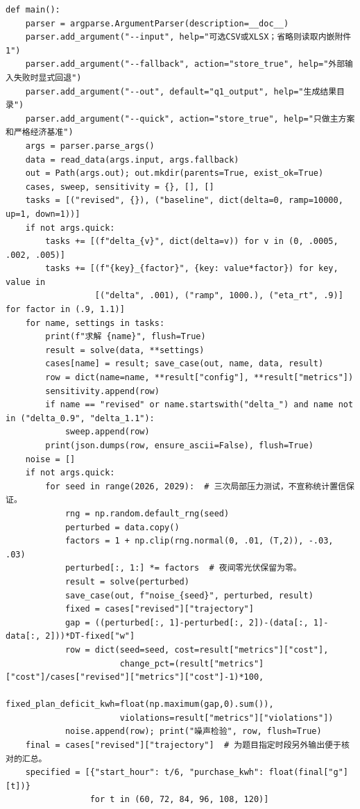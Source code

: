 \documentclass[withoutpreface,bwprint]{cumcmthesis}
\begin{document}
\begin{appendices}
\begin{lstlisting}
def main():
    parser = argparse.ArgumentParser(description=__doc__)
    parser.add_argument("--input", help="可选CSV或XLSX；省略则读取内嵌附件1")
    parser.add_argument("--fallback", action="store_true", help="外部输入失败时显式回退")
    parser.add_argument("--out", default="q1_output", help="生成结果目录")
    parser.add_argument("--quick", action="store_true", help="只做主方案和严格经济基准")
    args = parser.parse_args()
    data = read_data(args.input, args.fallback)
    out = Path(args.out); out.mkdir(parents=True, exist_ok=True)
    cases, sweep, sensitivity = {}, [], []
    tasks = [("revised", {}), ("baseline", dict(delta=0, ramp=10000, up=1, down=1))]
    if not args.quick:
        tasks += [(f"delta_{v}", dict(delta=v)) for v in (0, .0005, .002, .005)]
        tasks += [(f"{key}_{factor}", {key: value*factor}) for key, value in
                  [("delta", .001), ("ramp", 1000.), ("eta_rt", .9)] for factor in (.9, 1.1)]
    for name, settings in tasks:
        print(f"求解 {name}", flush=True)
        result = solve(data, **settings)
        cases[name] = result; save_case(out, name, data, result)
        row = dict(name=name, **result["config"], **result["metrics"])
        sensitivity.append(row)
        if name == "revised" or name.startswith("delta_") and name not in ("delta_0.9", "delta_1.1"):
            sweep.append(row)
        print(json.dumps(row, ensure_ascii=False), flush=True)
    noise = []
    if not args.quick:
        for seed in range(2026, 2029):  # 三次局部压力测试，不宣称统计置信保证。
            rng = np.random.default_rng(seed)
            perturbed = data.copy()
            factors = 1 + np.clip(rng.normal(0, .01, (T,2)), -.03, .03)
            perturbed[:, 1:] *= factors  # 夜间零光伏保留为零。
            result = solve(perturbed)
            save_case(out, f"noise_{seed}", perturbed, result)
            fixed = cases["revised"]["trajectory"]
            gap = ((perturbed[:, 1]-perturbed[:, 2])-(data[:, 1]-data[:, 2]))*DT-fixed["w"]
            row = dict(seed=seed, cost=result["metrics"]["cost"],
                       change_pct=(result["metrics"]["cost"]/cases["revised"]["metrics"]["cost"]-1)*100,
                       fixed_plan_deficit_kwh=float(np.maximum(gap,0).sum()),
                       violations=result["metrics"]["violations"])
            noise.append(row); print("噪声检验", row, flush=True)
    final = cases["revised"]["trajectory"]  # 为题目指定时段另外输出便于核对的汇总。
    specified = [{"start_hour": t/6, "purchase_kwh": float(final["g"][t])}
                 for t in (60, 72, 84, 96, 108, 120)]

\end{lstlisting}
\end{appendices}
\end{document}
